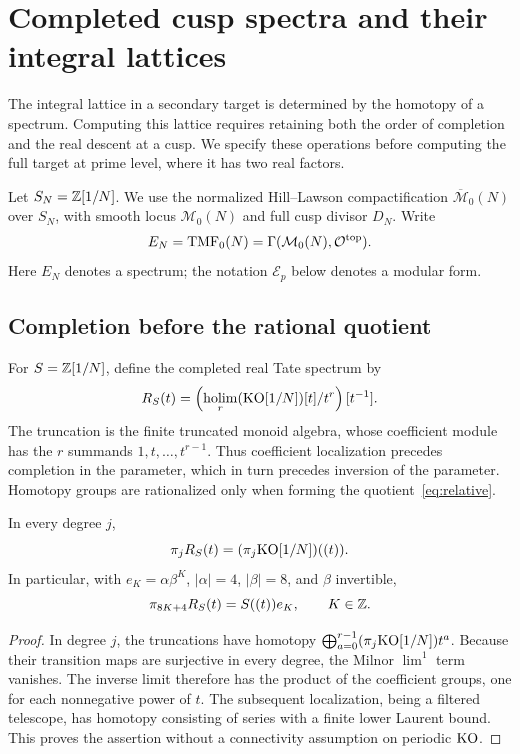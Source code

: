 \section{Completed cusp spectra and their integral lattices}\label{sec:cusps}

The integral lattice in a secondary target is determined by the homotopy
of a spectrum. Computing this lattice requires retaining both the order
of completion and the real descent at a cusp. We specify these operations
before computing the full target at prime level, where it has two real
factors.

Let $S_N=\mathbb Z[1/N]$. We use the normalized Hill--Lawson compactification
$\overline{\mathcal M}_0(N)$ over $S_N$, with smooth locus
$\mathcal M_0(N)$ and full cusp divisor $D_N$. Write
\[
 E_N=\mathrm{TMF}_0(N)=\Gamma(\mathcal M_0(N),\mathcal O^{\mathrm{top}}).
\]
Here $E_N$ denotes a spectrum; the notation $\mathcal E_p$ below
denotes a modular form.

\subsection{Completion before the rational quotient}
For $S=\mathbb Z[1/N]$, define the completed real Tate spectrum by
\begin{equation}\label{eq:ordered-completion}
 R_S(t)=\left(\operatorname*{holim}_r
        (\mathrm{KO}[1/N])[t]/t^r\right)[t^{-1}].
\end{equation}
The truncation is the finite truncated monoid algebra, whose coefficient
module has the $r$ summands $1,t,\ldots,t^{r-1}$. Thus coefficient
localization precedes completion in the parameter, which in turn
precedes inversion of the parameter. Homotopy groups are rationalized
only when forming the quotient~\eqref{eq:relative}.

\begin{lemma}\label{lem:completed-coefficients}
In every degree $j$,
\[
 \pi_jR_S(t)=(\pi_j\mathrm{KO}[1/N])((t)).
\]
In particular, with $e_K=\alpha\beta^K$, $|\alpha|=4$, $|\beta|=8$,
and $\beta$ invertible,
\begin{equation}\label{eq:real-lattice}
 \pi_{8K+4}R_S(t)=S((t))e_K,\qquad K\in\mathbb Z.
\end{equation}
\end{lemma}
\begin{proof}
In degree $j$, the truncations have homotopy
$\bigoplus_{a=0}^{r-1}(\pi_j\mathrm{KO}[1/N])t^a$. Because their transition maps
are surjective in every degree, the Milnor $\lim^1$ term vanishes.
The inverse limit therefore has the product of the coefficient groups,
one for each nonnegative power of $t$. The subsequent localization,
being a filtered telescope, has homotopy consisting of series with a
finite lower Laurent bound. This proves the assertion without a
connectivity assumption on periodic $\mathrm{KO}$.
\end{proof}

